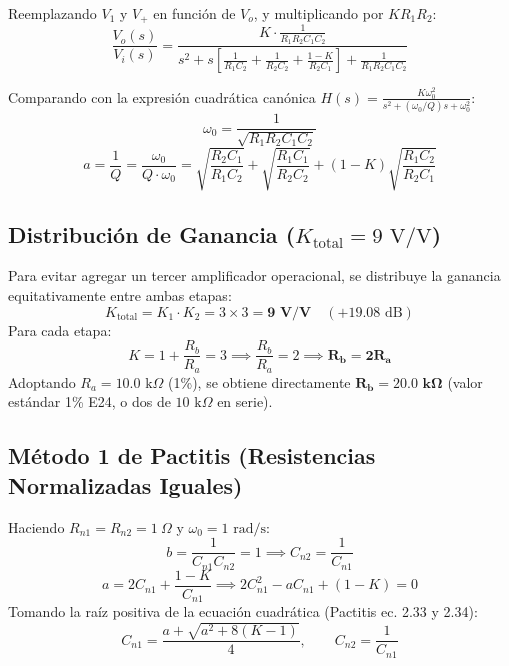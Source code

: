 \documentclass[a4paper,11pt]{article}
\begin{document}
Reemplazando $V_1$ y $V_+$ en función de $V_o$, y multiplicando por $K R_1 R_2$:
\begin{equation}
\frac{V_o(s)}{V_i(s)} = \frac{K \cdot \frac{1}{R_1 R_2 C_1 C_2}}{s^2 + s \left[ \frac{1}{R_1 C_2} + \frac{1}{R_2 C_2} + \frac{1 - K}{R_2 C_1} \right] + \frac{1}{R_1 R_2 C_1 C_2}}
\end{equation}

Comparando con la expresión cuadrática canónica $H(s) = \frac{K \omega_0^2}{s^2 + (\omega_0/Q) s + \omega_0^2}$:
\begin{equation}
\omega_0 = \frac{1}{\sqrt{R_1 R_2 C_1 C_2}}
\end{equation}
\begin{equation}
a = \frac{1}{Q} = \frac{\omega_0}{Q \cdot \omega_0} = \sqrt{\frac{R_2 C_1}{R_1 C_2}} + \sqrt{\frac{R_1 C_1}{R_2 C_2}} + (1 - K)\sqrt{\frac{R_1 C_2}{R_2 C_1}}
\end{equation}

\subsection{Distribución de Ganancia ($K_{\text{total}} = 9\text{ V/V}$)}
Para evitar agregar un tercer amplificador operacional, se distribuye la ganancia equitativamente entre ambas etapas:
\begin{equation}
K_{\text{total}} = K_1 \cdot K_2 = 3 \times 3 = \mathbf{9\text{ V/V}} \quad (+19.08\text{ dB})
\end{equation}
Para cada etapa:
\begin{equation}
K = 1 + \frac{R_b}{R_a} = 3 \implies \frac{R_b}{R_a} = 2 \implies \mathbf{R_b = 2 R_a}
\end{equation}
Adoptando $R_a = 10.0\text{ k}\Omega$ (1\%), se obtiene directamente $\mathbf{R_b = 20.0\text{ k}\Omega}$ (valor estándar 1\% E24, o dos de $10\text{ k}\Omega$ en serie).

\subsection{Método 1 de Pactitis (Resistencias Normalizadas Iguales)}
Haciendo $R_{n1} = R_{n2} = 1\ \Omega$ y $\omega_0 = 1\text{ rad/s}$:
\begin{equation}
b = \frac{1}{C_{n1} C_{n2}} = 1 \implies C_{n2} = \frac{1}{C_{n1}}
\end{equation}
\begin{equation}
a = 2 C_{n1} + \frac{1 - K}{C_{n1}} \implies 2 C_{n1}^2 - a C_{n1} + (1 - K) = 0
\end{equation}
Tomando la raíz positiva de la ecuación cuadrática (Pactitis ec. 2.33 y 2.34):
\begin{equation}
C_{n1} = \frac{a + \sqrt{a^2 + 8(K - 1)}}{4}, \qquad C_{n2} = \frac{1}{C_{n1}}
\end{equation}
\end{document}
